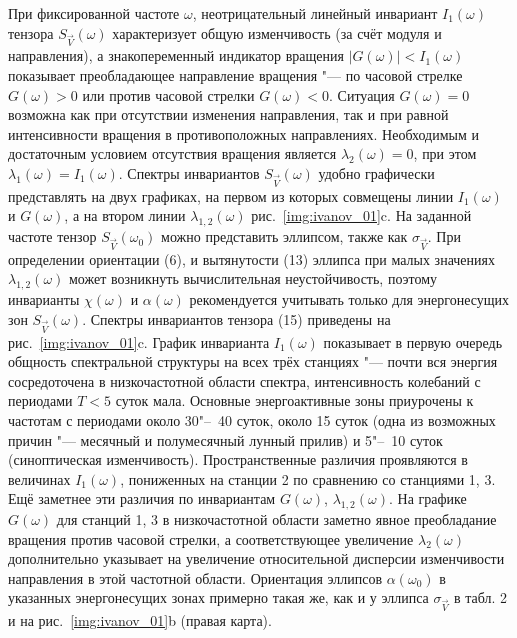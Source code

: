При фиксированной частоте $\omega$, неотрицательный линейный инвариант ${I_1}(\omega)$ тензора $S_{\vec{V}}(\omega)$ характеризует общую изменчивость (за счёт модуля и направления), а знакопеременный индикатор вращения $|G(\omega)|<{I_1}(\omega)$ показывает преобладающее направление вращения "--- по часовой стрелке $G(\omega)>0$ или против часовой стрелки $G(\omega)<0$. Ситуация $G(\omega)=0$ возможна как при отсутствии изменения направления, так и при равной интенсивности вращения в противоположных направлениях. Необходимым и достаточным условием отсутствия вращения является ${\lambda_{2}}(\omega)=0$, при этом ${\lambda_{1}}(\omega)={I_1}(\omega)$. Спектры инвариантов $S_{\vec{V}}(\omega)$ удобно графически представлять на двух графиках, на первом из которых совмещены линии  ${I_1}(\omega)$ и $G(\omega)$, а на втором линии ${\lambda_{1,2}}(\omega)$ рис.~\ref{img:ivanov_01}c. На заданной частоте тензор $S_{\vec{V}}(\omega_0)$ можно представить эллипсом, также как $\sigma_{\vec{V}}$. При определении ориентации (6), и вытянутости (13) эллипса при малых значениях ${\lambda_{1,2}}(\omega)$ может возникнуть вычислительная неустойчивость, поэтому инварианты $\chi(\omega)$ и $\alpha(\omega)$ рекомендуется учитывать только для энергонесущих зон $S_{\vec{V}}(\omega)$.
Спектры инвариантов тензора (15) приведены на рис.~\ref{img:ivanov_01}c. График инварианта ${I_1}(\omega)$ показывает в первую очередь общность спектральной структуры на всех трёх станциях "--- почти вся энергия сосредоточена в низкочастотной области спектра, интенсивность колебаний с периодами $T<5$ суток мала. Основные энергоактивные зоны приурочены к частотам с периодами около 30"--~40 суток, около 15 суток (одна из возможных причин "--- месячный и полумесячный лунный прилив) и 5"--~10 суток (синоптическая изменчивость). Пространственные различия проявляются в величинах ${I_1}(\omega)$, пониженных на станции 2 по сравнению со станциями 1, 3. Ещё заметнее эти различия по инвариантам $G(\omega)$, ${\lambda_{1,2}}(\omega)$. На графике $G(\omega)$ для станций 1, 3 в низкочастотной области заметно явное преобладание вращения против часовой стрелки, а соответствующее увеличение ${\lambda_{2}}(\omega)$ дополнительно указывает на увеличение относительной дисперсии изменчивости направления в этой частотной области. Ориентация эллипсов $\alpha(\omega_0)$ в указанных энергонесущих зонах примерно такая же, как и у эллипса $\sigma_{\vec{V}}$ в табл. 2 и на рис.~\ref{img:ivanov_01}b (правая карта).  

